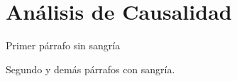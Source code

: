 \chapter{Análisis de Causalidad}

\noindent Primer párrafo sin sangría \par

Segundo y demás párrafos con sangría.